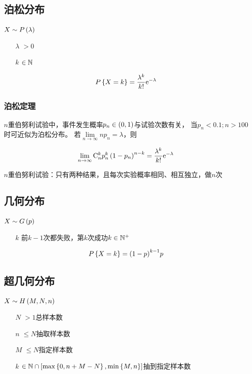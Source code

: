 \documentclass{article}
\begin{document}
\subsection{泊松分布}

$X\sim P\left(\lambda\right)$

\begin{enumerate}
    \item [$\lambda$] $>0$
    \item [$k$] $\in\mathbb N$
\end{enumerate}

\[P\left\{X=k\right\}=\frac{\lambda^k}{k!}\mathrm e^{-\lambda}\]

\subsubsection{泊松定理}

$n$重伯努利试验中，事件发生概率$p_n\in\left(0,1\right)$与试验次数有关，
当$p_n<0.1;n>100$时可近似为泊松分布。
若$\lim\limits_{n\to\infty}np_n=\lambda$，则

\[\lim_{n\to\infty}\mathrm C_n^kp_n^k\left(1-p_n\right)^{n-k}
    =\dfrac{\lambda^k}{k!}\mathrm e^{-\lambda}\]

$n$重伯努利试验：只有两种结果，且每次实验概率相同、相互独立，做$n$次

\subsection{几何分布}

$X\sim G\left(p\right)$

\begin{enumerate}
    \item [$k$] 前$k-1$次都失败，第$k$次成功$k\in\mathbb N^+$
\end{enumerate}

\[P\left\{X=k\right\}={\left(1-p\right)}^{k-1}p\]

\subsection{超几何分布}

$X\sim H\left(M,N,n\right)$

\begin{enumerate}
    \item [$N$] $>1$总样本数
    \item [$n$] $\leqslant N$抽取样本数
    \item [$M$] $\leqslant N$指定样本数
    \item [$k$] $\in\mathbb N\cap\left[\max\left\{0,n+M-N\right\},\min\left\{M,n\right\}\right]$抽到指定样本数
\end{enumerate}
\end{document}
